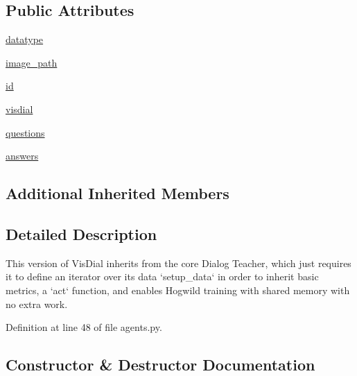 \subsection*{Public Attributes}
\begin{DoxyCompactItemize}
\item 
\hyperlink{classparlai_1_1tasks_1_1visdial_1_1agents_1_1DefaultTeacher_ab0c8e86570399b0ea8f6c96c49dc1b38}{datatype}
\item 
\hyperlink{classparlai_1_1tasks_1_1visdial_1_1agents_1_1DefaultTeacher_a81c9d1779709d5dbf85b927ac4362496}{image\+\_\+path}
\item 
\hyperlink{classparlai_1_1tasks_1_1visdial_1_1agents_1_1DefaultTeacher_af57a8b4ff4119a00559189e2e1fb4ab9}{id}
\item 
\hyperlink{classparlai_1_1tasks_1_1visdial_1_1agents_1_1DefaultTeacher_a8cb96fb50b9c8d040dcb9bd8dd3d1d3e}{visdial}
\item 
\hyperlink{classparlai_1_1tasks_1_1visdial_1_1agents_1_1DefaultTeacher_a4e9d61cd05584be7a63d7407372ce13a}{questions}
\item 
\hyperlink{classparlai_1_1tasks_1_1visdial_1_1agents_1_1DefaultTeacher_a34ad9bd4ee7fcc11445e1df938f0d209}{answers}
\end{DoxyCompactItemize}
\subsection*{Additional Inherited Members}


\subsection{Detailed Description}
\begin{DoxyVerb}This version of VisDial inherits from the core Dialog Teacher, which just
requires it to define an iterator over its data `setup_data` in order to
inherit basic metrics, a `act` function, and enables
Hogwild training with shared memory with no extra work.
\end{DoxyVerb}
 

Definition at line 48 of file agents.\+py.



\subsection{Constructor \& Destructor Documentation}
\mbox{\label{classparlai_1_1tasks_1_1visdial_1_1agents_1_1DefaultTeacher_ad888b8b7612e78dec919a6769f7e0623}} 
